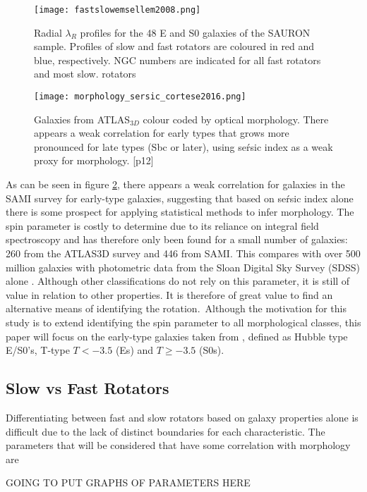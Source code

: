\begin{figure}[h]
	\caption{Radial $\lambda_{R}$ profiles for the 48 E and S0 galaxies of the SAURON
	sample. Profiles of slow and fast rotators are coloured in red and blue, respectively.
	NGC numbers are indicated for all fast rotators and most slow.
	rotators \cite[p.6]{Emsellem2011}}
	\centering
	\texttt{[image: fastslowemsellem2008.png]}
	\label{fig:morphsplit}
\end{figure}

\begin{figure}[h]
	\caption{Galaxies from ATLAS$_{3D}$ colour coded by optical morphology. There appears a weak correlation for early types that grows more pronounced for late types (Sbc or later), using se\'rsic index as a weak proxy for morphology.	
		\cite{Cortese2016}[p12]}
	\centering
	\texttt{[image: morphology\_sersic\_cortese2016.png]}
	\label{fig:morphologysersic}
\end{figure}

As can be seen in figure \ref{fig:morphologysersic}, there appears a weak correlation for galaxies in the SAMI survey for early-type galaxies, suggesting that based on se\'rsic index alone there is some prospect for applying statistical methods to infer morphology.
The spin parameter is costly to determine due to its reliance on integral field spectroscopy and has therefore only been found for a small number of galaxies: 260 from the ATLAS3D survey and 446 from SAMI. This compares with over 500 million galaxies with photometric data from the Sloan Digital Sky Survey (SDSS) alone \cite{SDSS}. Although other classifications do not rely on this parameter, it is still of value in relation to other properties. It is therefore of great value to find an alternative means of identifying the rotation.\
Although the motivation for this study is to extend identifying the spin parameter to all morphological classes, this paper will focus on the early-type galaxies taken from \cite{Emsellem2011}, defined as Hubble type E/S0's, T-type $T < −3.5$ (Es) and $T \geq −3.5$ (S0s).
\subsection{Slow vs Fast Rotators}
Differentiating between fast and slow rotators based on galaxy properties alone is difficult due to the lack of distinct boundaries for each characteristic. The parameters that will be considered that have some correlation with morphology are

GOING TO PUT GRAPHS OF PARAMETERS HERE


